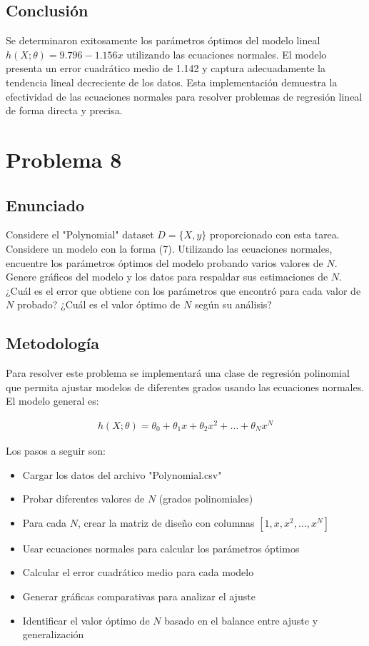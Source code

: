 \documentclass{article}
\begin{document}
\subsection{Conclusión}

Se determinaron exitosamente los parámetros óptimos del modelo lineal $h(X;\theta) = 9.796 - 1.156x$ utilizando las ecuaciones normales. El modelo presenta un error cuadrático medio de 1.142 y captura adecuadamente la tendencia lineal decreciente de los datos. Esta implementación demuestra la efectividad de las ecuaciones normales para resolver problemas de regresión lineal de forma directa y precisa.

\section{Problema 8}

\subsection{Enunciado}

Considere el "Polynomial" dataset $D = \{X,y\}$ proporcionado con esta tarea. Considere un modelo con la forma (7). Utilizando las ecuaciones normales, encuentre los parámetros óptimos del modelo probando varios valores de $N$. Genere gráficos del modelo y los datos para respaldar sus estimaciones de $N$. ¿Cuál es el error que obtiene con los parámetros que encontró para cada valor de $N$ probado? ¿Cuál es el valor óptimo de $N$ según su análisis?

\subsection{Metodología}

Para resolver este problema se implementará una clase de regresión polinomial que permita ajustar modelos de diferentes grados usando las ecuaciones normales. El modelo general es:

\begin{align}
h(X;\theta) = \theta_0 + \theta_1 x + \theta_2 x^2 + \ldots + \theta_N x^N
\end{align}

Los pasos a seguir son:
\begin{itemize}
    \item Cargar los datos del archivo "Polynomial.csv"
    \item Probar diferentes valores de $N$ (grados polinomiales)
    \item Para cada $N$, crear la matriz de diseño con columnas $[1, x, x^2, \ldots, x^N]$
    \item Usar ecuaciones normales para calcular los parámetros óptimos
    \item Calcular el error cuadrático medio para cada modelo
    \item Generar gráficas comparativas para analizar el ajuste
    \item Identificar el valor óptimo de $N$ basado en el balance entre ajuste y generalización
\end{itemize}
\end{document}
